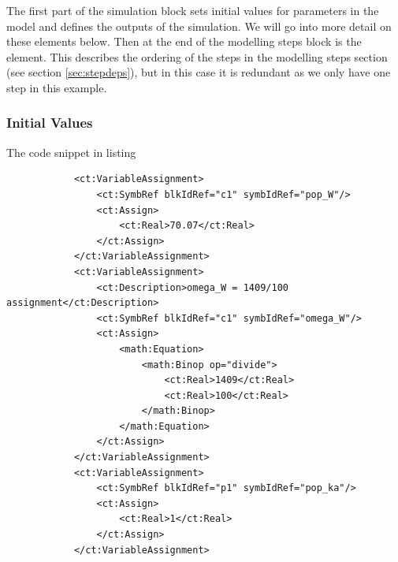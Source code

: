 

The first part of the simulation block sets initial values for
parameters in the model and defines the outputs of the simulation. We
will go into more detail on these elements below. Then at the end of
the modelling steps block is the 
element. This describes the ordering of the steps in the modelling
steps section (see section \ref{sec:stepdeps}), but in this case it is
redundant as we only have one step in this example.

\subsubsection{Initial Values}

The code snippet in listing 
\lstset{language=XML}
\begin{lstlisting}
            <ct:VariableAssignment>
                <ct:SymbRef blkIdRef="c1" symbIdRef="pop_W"/>
                <ct:Assign>
                    <ct:Real>70.07</ct:Real>
                </ct:Assign>
            </ct:VariableAssignment>
            <ct:VariableAssignment>
                <ct:Description>omega_W = 1409/100 assignment</ct:Description>
                <ct:SymbRef blkIdRef="c1" symbIdRef="omega_W"/>
                <ct:Assign>
                    <math:Equation>
                        <math:Binop op="divide">
                            <ct:Real>1409</ct:Real>
                            <ct:Real>100</ct:Real>
                        </math:Binop>
                    </math:Equation>
                </ct:Assign>
            </ct:VariableAssignment>
            <ct:VariableAssignment>
                <ct:SymbRef blkIdRef="p1" symbIdRef="pop_ka"/>
                <ct:Assign>
                    <ct:Real>1</ct:Real>
                </ct:Assign>
            </ct:VariableAssignment>
\end{lstlisting}

